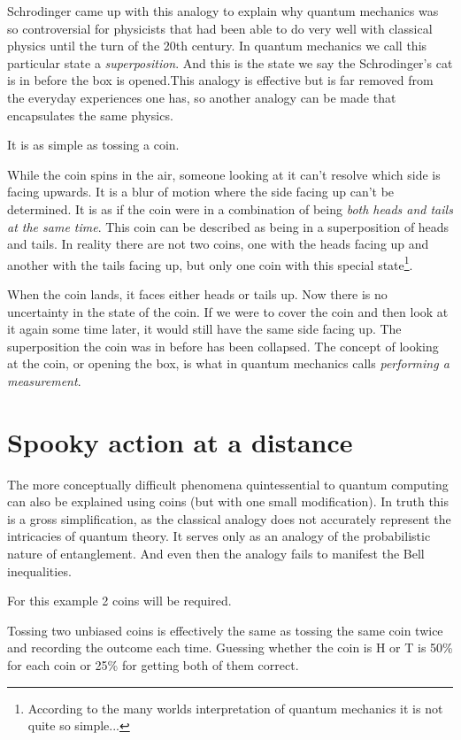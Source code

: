 \documentclass{book}
\begin{document}
Schrodinger came up with this analogy to explain why quantum mechanics was so controversial for physicists that had been able to do very well with classical physics until the turn of the 20th century. In quantum mechanics we call this particular state a \textit{superposition}. And this is the state we say the Schrodinger's cat is in before the box is opened.This analogy is effective but is far removed from the everyday experiences one has, so another analogy can be made that encapsulates the same physics. 

It is as simple as tossing a coin.  

While the coin spins in the air, someone looking at it can't resolve which side is facing upwards. It is a blur of motion where the side facing up can't be determined. It is as if the coin were in a combination of being \textit{both heads and tails at the same time}.  This coin can be described as being in a superposition of heads and tails. In reality there are not two coins, one with the heads facing up and another with the tails facing up, but only one coin with this special state\footnote{According to the many worlds interpretation of quantum mechanics it is not quite so simple...}.

When the coin lands, it faces either heads or tails up. Now there is no uncertainty in the state of the coin. If we were to cover the coin and then look at it again some time later, it would still have the same side facing up. The superposition the coin was in before has been collapsed. The concept of looking at the coin, or opening the box, is what in quantum mechanics calls \textit{performing a measurement}.

\section{Spooky action at a distance}

The more conceptually difficult phenomena quintessential to quantum computing can also be explained using coins (but with one small modification). In truth this is a gross simplification, as the classical analogy does not accurately represent the intricacies of quantum theory. It serves only as an analogy of the probabilistic nature of entanglement. And even then the analogy fails to manifest the Bell inequalities. 

For this example 2 coins will be required. 

Tossing two unbiased coins is effectively the same as tossing the same coin twice and recording the outcome each time. Guessing whether the coin is H or T is 50\% for each coin or 25\% for getting both of them correct. 
\end{document}
